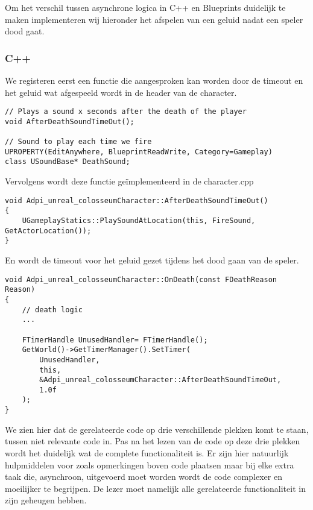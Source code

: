 Om het verschil tussen asynchrone logica in C++ en Blueprints duidelijk te maken implementeren wij hieronder het afspelen van een geluid nadat een speler dood gaat.

\subsubsection{C++}
We registeren eerst een functie die aangesproken kan worden door de timeout en het geluid wat afgespeeld wordt in de header van de character.

\begin{lstlisting}[caption=Registratie van de timeout functie en het geluid]	
// Plays a sound x seconds after the death of the player
void AfterDeathSoundTimeOut();

// Sound to play each time we fire
UPROPERTY(EditAnywhere, BlueprintReadWrite, Category=Gameplay)
class USoundBase* DeathSound;
\end{lstlisting}

Vervolgens wordt deze functie geïmplementeerd in de character.cpp

\begin{lstlisting}[caption=Registratie van de timeout functie en het geluid]
void Adpi_unreal_colosseumCharacter::AfterDeathSoundTimeOut() 
{
	UGameplayStatics::PlaySoundAtLocation(this, FireSound, GetActorLocation());
}
\end{lstlisting}

En wordt de timeout voor het geluid gezet tijdens het dood gaan van de speler.

\begin{lstlisting}[caption=Implementatie van de OnDeath functie]
void Adpi_unreal_colosseumCharacter::OnDeath(const FDeathReason Reason)
{
	// death logic
	...

	FTimerHandle UnusedHandler= FTimerHandle();
	GetWorld()->GetTimerManager().SetTimer(
		UnusedHandler, 
		this, 
		&Adpi_unreal_colosseumCharacter::AfterDeathSoundTimeOut, 
		1.0f
	);
}
\end{lstlisting}

We zien hier dat de gerelateerde code op drie verschillende plekken komt te staan, tussen niet relevante code in. Pas na het lezen van de code op deze drie plekken wordt het duidelijk wat de complete functionaliteit is. Er zijn hier natuurlijk hulpmiddelen voor zoals opmerkingen boven code plaatsen maar bij elke extra taak die, asynchroon, uitgevoerd moet worden wordt de code complexer en moeilijker te begrijpen. De lezer moet namelijk alle gerelateerde functionaliteit in zijn geheugen hebben.

